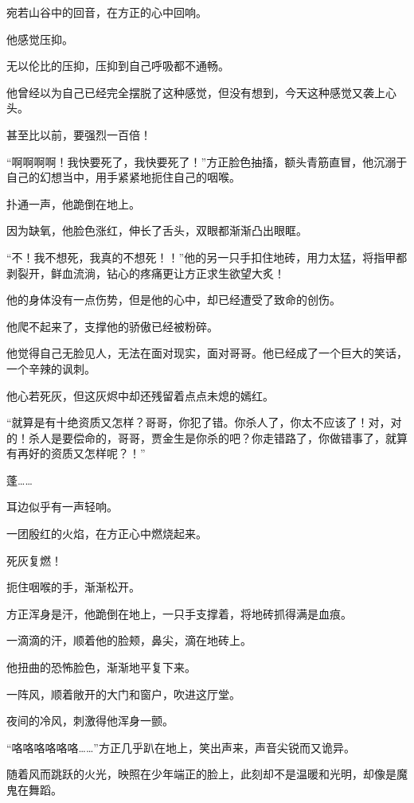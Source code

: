\begin{this_body}
宛若山谷中的回音，在方正的心中回响。

他感觉压抑。

无以伦比的压抑，压抑到自己呼吸都不通畅。

他曾经以为自己已经完全摆脱了这种感觉，但没有想到，今天这种感觉又袭上心头。

甚至比以前，要强烈一百倍！

“啊啊啊啊！我快要死了，我快要死了！”方正脸色抽搐，额头青筋直冒，他沉溺于自己的幻想当中，用手紧紧地扼住自己的咽喉。

扑通一声，他跪倒在地上。

因为缺氧，他脸色涨红，伸长了舌头，双眼都渐渐凸出眼眶。

“不！我不想死，我真的不想死！！”他的另一只手扣住地砖，用力太猛，将指甲都剥裂开，鲜血流淌，钻心的疼痛更让方正求生欲望大炙！

他的身体没有一点伤势，但是他的心中，却已经遭受了致命的创伤。

他爬不起来了，支撑他的骄傲已经被粉碎。

他觉得自己无脸见人，无法在面对现实，面对哥哥。他已经成了一个巨大的笑话，一个辛辣的讽刺。

他心若死灰，但这灰烬中却还残留着点点未熄的嫣红。

“就算是有十绝资质又怎样？哥哥，你犯了错。你杀人了，你太不应该了！对，对的！杀人是要偿命的，哥哥，贾金生是你杀的吧？你走错路了，你做错事了，就算有再好的资质又怎样呢？！”

蓬……

耳边似乎有一声轻响。

一团殷红的火焰，在方正心中燃烧起来。

死灰复燃！

扼住咽喉的手，渐渐松开。

方正浑身是汗，他跪倒在地上，一只手支撑着，将地砖抓得满是血痕。

一滴滴的汗，顺着他的脸颊，鼻尖，滴在地砖上。

他扭曲的恐怖脸色，渐渐地平复下来。

一阵风，顺着敞开的大门和窗户，吹进这厅堂。

夜间的冷风，刺激得他浑身一颤。

“咯咯咯咯咯咯……”方正几乎趴在地上，笑出声来，声音尖锐而又诡异。

随着风而跳跃的火光，映照在少年端正的脸上，此刻却不是温暖和光明，却像是魔鬼在舞蹈。

\end{this_body}

